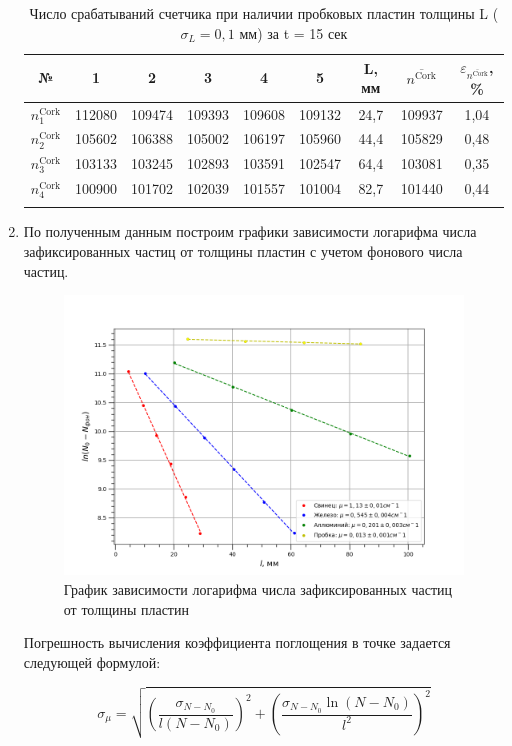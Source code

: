 \documentclass[a4paper, 12pt]{article}%
\begin{document}
\begin{enumerate}
		\begin{longtable}{|c|c|c|c|c|c|c|c|c|}
		\hline
		№ & 1 & 2 & 3 & 4 & 5 & L, мм & $\overline{n^{\text{Cork}}}$ &  $\varepsilon_{\overline{n^{\text{Cork}}}}$, \%\\ \hline
		$n_{1}^{\text{Cork}}$ & 112080 & 109474 & 109393 & 109608 & 109132 & 24,7 & 109937 & 1,04\\ \hline
		$n_{2}^{\text{Cork}}$ & 105602 & 106388 & 105002 & 106197 & 105960 & 44,4 & 105829 & 0,48\\ \hline
		$n_{3}^{\text{Cork}}$ & 103133 & 103245 & 102893 & 103591 & 102547 & 64,4 & 103081 & 0,35\\ \hline
		$n_{4}^{\text{Cork}}$ & 100900 & 101702 & 102039 & 101557 & 101004 & 82,7 & 101440 & 0,44\\ \hline
		\caption{Число срабатываний счетчика при наличии пробковых  пластин толщины L ($\sigma_L = 0,1$ мм) за t = 15 сек}
	\end{longtable}

	
	\item По полученным данным построим графики зависимости логарифма числа зафиксированных частиц от толщины пластин с учетом фонового числа частиц.
	
 	\begin{figure}[h]
		\includegraphics[scale=0.7]{graph.png}
		\centering
		\caption{График зависимости логарифма числа зафиксированных частиц от толщины пластин}
	\end{figure}
	
	Погрешность вычисления коэффициента поглощения в точке задается следующей формулой: 
	
	$$ \sigma_{\mu} = \sqrt{ \left(\frac{\sigma_{N-N_0}}{l(N-N_0)} \right)^2 + \left(\frac{\sigma_{N-N_0} \ln(N-N_0)}{l^2}\right)^2} $$
	

\end{enumerate}
\end{document}
